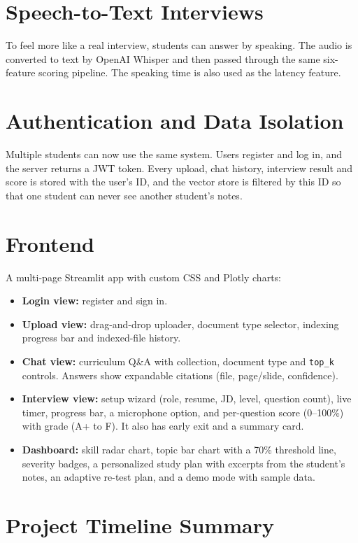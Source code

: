 \documentclass[11pt,a4paper]{report}
\begin{document}
\section{Speech-to-Text Interviews}

To feel more like a real interview, students can answer by speaking. The audio is converted to text by OpenAI Whisper and then passed through the same six-feature scoring pipeline. The speaking time is also used as the latency feature.

\section{Authentication and Data Isolation}

Multiple students can now use the same system. Users register and log in, and the server returns a JWT token. Every upload, chat history, interview result and score is stored with the user's ID, and the vector store is filtered by this ID so that one student can never see another student's notes.

\section{Frontend}

A multi-page Streamlit app with custom CSS and Plotly charts:

\begin{itemize}
  \item \textbf{Login view:} register and sign in.
  \item \textbf{Upload view:} drag-and-drop uploader, document type selector, indexing progress bar and indexed-file history.
  \item \textbf{Chat view:} curriculum Q\&A with collection, document type and \texttt{top\_k} controls. Answers show expandable citations (file, page/slide, confidence).
  \item \textbf{Interview view:} setup wizard (role, resume, JD, level, question count), live timer, progress bar, a microphone option, and per-question score (0--100\%) with grade (A+ to F). It also has early exit and a summary card.
  \item \textbf{Dashboard:} skill radar chart, topic bar chart with a 70\% threshold line, severity badges, a personalized study plan with excerpts from the student's notes, an adaptive re-test plan, and a demo mode with sample data.
\end{itemize}

\section{Project Timeline Summary}
\end{document}

